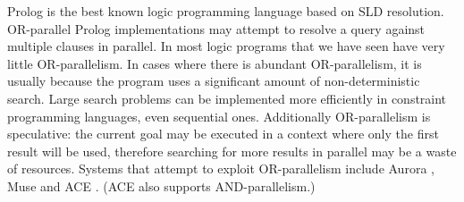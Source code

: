 Prolog is the best known logic programming language based on SLD
resolution.
OR-parallel Prolog implementations may attempt to resolve a query against
multiple clauses in parallel.
In most logic programs that we have seen have very little OR-parallelism.
In cases where there is abundant OR-parallelism,
it is usually because the program uses a significant amount of
non-deterministic search.
Large search problems can be implemented more efficiently in constraint
programming languages, even sequential ones.
Additionally OR-parallelism is speculative:
the current goal may be executed in a context where only the first result
will be used,
therefore searching for more results in parallel may be a waste of
resources.
Systems that attempt to exploit OR-parallelism include
Aurora \citep*{lusk:1990:aurora},
Muse \citep*{ali:1990:muse}
and ACE \citep*{gupta:1991:ace}.
(ACE also supports AND-parallelism.)

